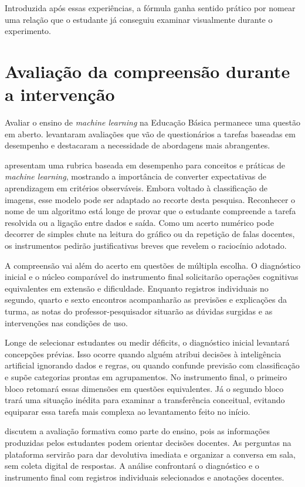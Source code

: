 Introduzida após essas experiências, a fórmula ganha sentido prático por nomear uma relação que o estudante já conseguiu examinar visualmente durante o experimento.

\section{Avaliação da compreensão durante a intervenção}

Avaliar o ensino de \textit{machine learning} na Educação Básica permanece uma questão em aberto.  levantaram avaliações que vão de questionários a tarefas baseadas em desempenho e destacaram a necessidade de abordagens mais abrangentes.

 apresentam uma rubrica baseada em desempenho para conceitos e práticas de \textit{machine learning}, mostrando a importância de converter expectativas de aprendizagem em critérios observáveis. Embora voltado à classificação de imagens, esse modelo pode ser adaptado ao recorte desta pesquisa. Reconhecer o nome de um algoritmo está longe de provar que o estudante compreende a tarefa resolvida ou a ligação entre dados e saída. Como um acerto numérico pode decorrer de simples chute na leitura do gráfico ou da repetição de falas docentes, os instrumentos pedirão justificativas breves que revelem o raciocínio adotado.

A compreensão vai além do acerto em questões de múltipla escolha. O diagnóstico inicial e o núcleo comparável do instrumento final solicitarão operações cognitivas equivalentes em extensão e dificuldade. Enquanto registros individuais no segundo, quarto e sexto encontros acompanharão as previsões e explicações da turma, as notas do professor-pesquisador situarão as dúvidas surgidas e as intervenções nas condições de uso.

Longe de selecionar estudantes ou medir déficits, o diagnóstico inicial levantará concepções prévias. Isso ocorre quando alguém atribui decisões à inteligência artificial ignorando dados e regras, ou quando confunde previsão com classificação e supõe categorias prontas em agrupamentos. No instrumento final, o primeiro bloco retomará essas dimensões em questões equivalentes. Já o segundo bloco trará uma situação inédita para examinar a transferência conceitual, evitando equiparar essa tarefa mais complexa ao levantamento feito no início.

 discutem a avaliação formativa como parte do ensino, pois as informações produzidas pelos estudantes podem orientar decisões docentes. As perguntas na plataforma servirão para dar devolutiva imediata e organizar a conversa em sala, sem coleta digital de respostas. A análise confrontará o diagnóstico e o instrumento final com registros individuais selecionados e anotações docentes.

